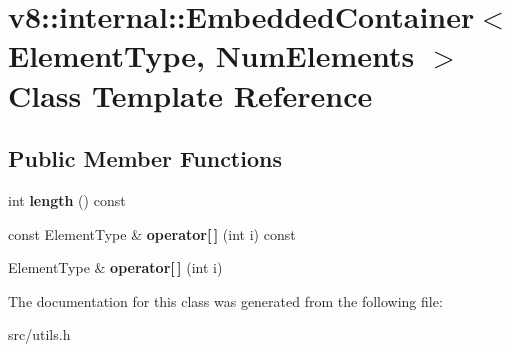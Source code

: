 \hypertarget{classv8_1_1internal_1_1_embedded_container}{}\section{v8\+:\+:internal\+:\+:Embedded\+Container$<$ Element\+Type, Num\+Elements $>$ Class Template Reference}
\label{classv8_1_1internal_1_1_embedded_container}
\subsection*{Public Member Functions}
\begin{DoxyCompactItemize}
\item 
\hypertarget{classv8_1_1internal_1_1_embedded_container_a4974384f3a7533af4314498377d153d0}{}int {\bfseries length} () const \label{classv8_1_1internal_1_1_embedded_container_a4974384f3a7533af4314498377d153d0}

\item 
\hypertarget{classv8_1_1internal_1_1_embedded_container_a25cb752548c298f0f2659e04aa9da9dc}{}const Element\+Type \& {\bfseries operator\mbox{[}$\,$\mbox{]}} (int i) const \label{classv8_1_1internal_1_1_embedded_container_a25cb752548c298f0f2659e04aa9da9dc}

\item 
\hypertarget{classv8_1_1internal_1_1_embedded_container_a30ea902e600baaf5e21457d790102f8f}{}Element\+Type \& {\bfseries operator\mbox{[}$\,$\mbox{]}} (int i)\label{classv8_1_1internal_1_1_embedded_container_a30ea902e600baaf5e21457d790102f8f}

\end{DoxyCompactItemize}


The documentation for this class was generated from the following file\+:\begin{DoxyCompactItemize}
\item 
src/utils.\+h\end{DoxyCompactItemize}
